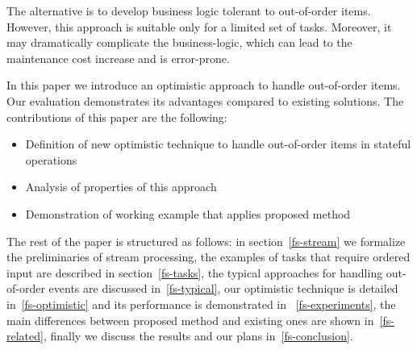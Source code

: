 The alternative is to develop business logic tolerant to out-of-order items. However, this approach is suitable only for a limited set of tasks. Moreover, it may dramatically complicate the business-logic, which can lead to the maintenance cost increase and is error-prone.

In this paper we introduce an optimistic approach to handle out-of-order items. Our evaluation demonstrates its advantages compared to existing solutions. The contributions of this paper are the following: 

\begin {itemize}
  \item Definition of new optimistic technique to handle out-of-order items in stateful operations
  \item Analysis of properties of this approach
  \item Demonstration of working example that applies proposed method
\end {itemize}

The rest of the paper is structured as follows: in section~\ref{fs-stream} we formalize the preliminaries of stream processing, the examples of tasks that require ordered input are described in section~\ref{fs-tasks}, the typical approaches for handling out-of-order events are discussed in~\ref{fs-typical}, our optimistic technique is detailed in~\ref{fs-optimistic} and its performance is demonstrated in ~\ref{fs-experiments}, the main differences between proposed method and existing ones are shown in~\ref{fs-related}, finally we discuss the results and our plans in~\ref{fs-conclusion}.

